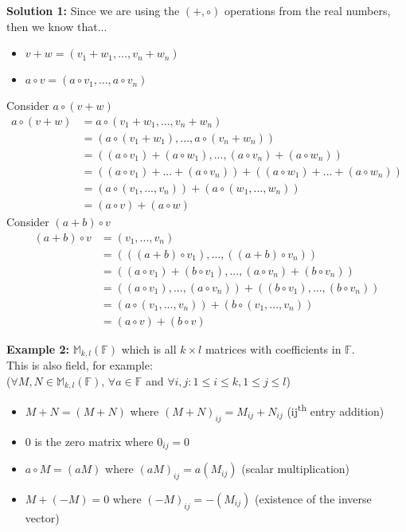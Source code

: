 \documentclass[12pt]{article}
\newcommand{\ts}{\textsuperscript}
\begin{document}
\textbf{Solution 1:} Since we are using the $(+, \circ)$ operations from the real numbers, then we know that...
\begin{itemize}
	\item{$v+w = (v_1 + w_1, ... ,  v_n + w_n)$}
	\item{$a \circ v = (a \circ v_1, ... , a \circ v_n)$}
\end{itemize}
Consider $a \circ (v + w)$
\begin{align*}
a \circ (v + w) &= a \circ (v_1 + w_1, ... ,  v_n + w_n)\\
&= (a \circ (v_1 + w_1), ... ,a \circ (v_n + w_n))\\
&= ((a \circ v_1) + (a \circ w_1), ... , (a \circ v_n) + (a \circ w_n))\\
&= ((a \circ v_1) + ... + (a \circ v_n)) + ((a \circ w_1) + ... + (a \circ w_n))\\
&= (a \circ (v_1, ... ,  v_n)) + (a \circ (w_1, ... ,  w_n))\\
&= (a \circ v) + (a \circ w)
\end{align*}
Consider $(a + b) \circ v$
\begin{align*}
	(a + b) \circ v &= (v_1, ... ,  v_n)\\
	&= (((a + b) \circ v_1), ... ,  ((a + b) \circ v_n))\\
	&= ((a \circ v_1) + (b \circ v_1), ... ,  (a \circ v_n) + (b \circ v_n))\\
	&= ((a \circ v_1), ... ,  (a \circ v_n)) + ((b \circ v_1), ... ,  (b \circ v_n))\\
	&= (a \circ (v_1, ... ,  v_n)) + (b \circ (v_1, ... ,  v_n))\\
	&= (a \circ v) + (b \circ v)
\end{align*}

\textbf{Example 2:} $\mathbb{M}_{k,l}(\mathbb{F})$ which is all $k \times l$ matrices with coefficients in $\mathbb{F}$.\\
This is also field, for example:\\
($\forall M,N \in \mathbb{M}_{k,l}(\mathbb{F})$, $\forall a \in\mathbb{F}$ and $\forall i,j : 1 \leq i \leq k, 1 \leq j \leq l$)

\begin{itemize}
	\item{$M + N = (M + N)$ where $(M+N)_{ij} = M_{ij} + N_{ij}$ (ij\ts{th} entry addition)}
	\item{0 is the zero matrix where $0_{ij} = 0$}
	\item{$a \circ M = (aM)$ where $(aM)_{ij} = a (M_{ij})$ (scalar multiplication)}
	\item{$M + (-M) = 0$ where $(-M)_{ij} = -(M_{ij})$ (existence of the inverse vector)}
\end{itemize}
\end{document}
